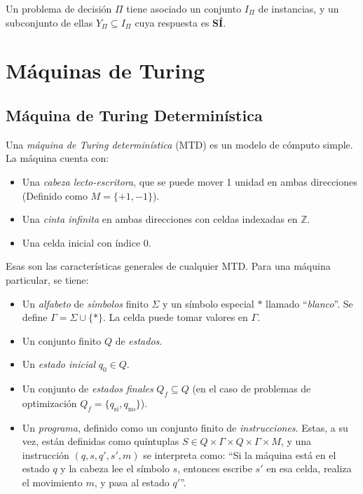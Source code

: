 \documentclass[a4paper]{report}
\newcommand{\Z}{\mathbb{Z}}
\begin{document}
Un problema de decisión $\Pi$ tiene asociado un conjunto $I_{\Pi}$ de instancias, y un subconjunto de ellas $Y_{\Pi} \subseteq I_{\Pi}$ cuya respuesta es \textbf{SÍ}.

\section{Máquinas de Turing}

\subsection{Máquina de Turing Determinística}

Una \textit{máquina de Turing determinística} (MTD) es un modelo de cómputo simple. La máquina cuenta con:
\begin{itemize}
    \item Una \textit{cabeza lecto-escritora}, que se puede mover 1 unidad en ambas direcciones (Definido como $M = \{+1, -1\}$).
    \item Una \textit{cinta infinita} en ambas direcciones con celdas indexadas en $\Z$.
    \item Una celda inicial con índice $0$.
\end{itemize}

Esas son las características generales de cualquier MTD. Para una máquina particular, se tiene:
\begin{itemize}
    \item Un \textit{alfabeto} de \textit{símbolos} finito $\Sigma$ y un símbolo especial $\ast$ llamado ``\textit{blanco}''. Se define $\Gamma = \Sigma \cup \{\ast\}$. La celda puede tomar valores en $\Gamma$.
    \item Un conjunto finito $Q$ de \textit{estados}.
    \item Un \textit{estado inicial} $q_0 \in Q$.
    \item Un conjunto de \textit{estados finales} $Q_f \subseteq Q$ (en el caso de problemas de optimización $Q_f = \{q_{\text{sí}}, q_{\text{no}}\}$).
    \item Un \textit{programa}, definido como un conjunto finito de \textit{instrucciones}. Estas, a su vez, están definidas como quíntuplas $S \in Q \times \Gamma \times Q \times \Gamma \times M$, y una instrucción $(q, s, q', s', m)$ se interpreta como: ``Si la máquina está en el estado $q$ y la cabeza lee el símbolo $s$, entonces escribe $s'$ en esa celda, realiza el movimiento $m$, y pasa al estado $q'$''.
\end{itemize}
\end{document}
